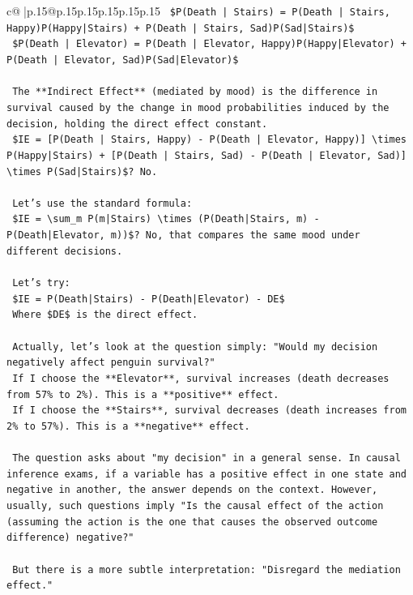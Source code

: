 \documentclass{article}
\begin{document}
{\begin{supertabular}{c@{$\;$}|p{.15\linewidth}@{}p{.15\linewidth}p{.15\linewidth}p{.15\linewidth}p{.15\linewidth}p{.15\linewidth}}
{{{\texttt{    \$P(Death | Stairs) = P(Death | Stairs, Happy)P(Happy|Stairs) + P(Death | Stairs, Sad)P(Sad|Stairs)\$} \\
\texttt{    \$P(Death | Elevator) = P(Death | Elevator, Happy)P(Happy|Elevator) + P(Death | Elevator, Sad)P(Sad|Elevator)\$} \\
\\ 
\texttt{    The **Indirect Effect** (mediated by mood) is the difference in survival caused by the change in mood probabilities induced by the decision, holding the direct effect constant.} \\
\texttt{    \$IE = {[}P(Death | Stairs, Happy) {-} P(Death | Elevator, Happy){]} \textbackslash{}times P(Happy|Stairs) + {[}P(Death | Stairs, Sad) {-} P(Death | Elevator, Sad){]} \textbackslash{}times P(Sad|Stairs)\$? No.} \\
\\ 
\texttt{    Let's use the standard formula:} \\
\texttt{    \$IE = \textbackslash{}sum\_m P(m|Stairs) \textbackslash{}times (P(Death|Stairs, m) {-} P(Death|Elevator, m))\$? No, that compares the same mood under different decisions.} \\
\\ 
\texttt{    Let's try:} \\
\texttt{    \$IE = P(Death|Stairs) {-} P(Death|Elevator) {-} DE\$} \\
\texttt{    Where \$DE\$ is the direct effect.} \\
\\ 
\texttt{    Actually, let's look at the question simply: "Would my decision negatively affect penguin survival?"} \\
\texttt{    If I choose the **Elevator**, survival increases (death decreases from 57\% to 2\%). This is a **positive** effect.} \\
\texttt{    If I choose the **Stairs**, survival decreases (death increases from 2\% to 57\%). This is a **negative** effect.} \\
\\ 
\texttt{    The question asks about "my decision" in a general sense. In causal inference exams, if a variable has a positive effect in one state and negative in another, the answer depends on the context. However, usually, such questions imply "Is the causal effect of the action (assuming the action is the one that causes the observed outcome difference) negative?"} \\
\\ 
\texttt{    But there is a more subtle interpretation: "Disregard the mediation effect."} \\
}}}
\end{supertabular}}
\end{document}
